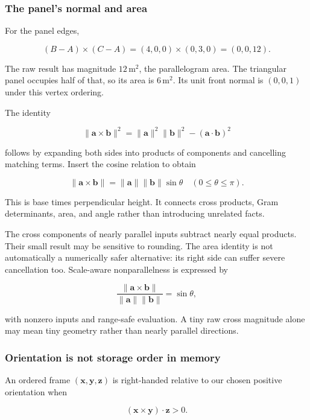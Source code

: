 \subsubsection{The panel's normal and area}\label{01-foundations-i-ch017-the-panels-normal-and-area}

For the panel edges,

\[
(B-A)\times(C-A)=(4,0,0)\times(0,3,0)=(0,0,12).
\]

The raw result has magnitude \(12\,\mathrm{m}^2\), the parallelogram area. The triangular panel occupies half of that, so its area is \(6\,\mathrm{m}^2\). Its unit front normal is \((0,0,1)\) under this vertex ordering.

The identity

\[
\|\mathbf a\times\mathbf b\|^2
=\|\mathbf a\|^2\|\mathbf b\|^2-(\mathbf a\cdot\mathbf b)^2
\]

follows by expanding both sides into products of components and cancelling matching terms. Insert the cosine relation to obtain

\[
\|\mathbf a\times\mathbf b\|=\|\mathbf a\|\|\mathbf b\|\sin\theta
\quad(0\le\theta\le\pi).
\]

This is base times perpendicular height. It connects cross products, Gram determinants, area, and angle rather than introducing unrelated facts.

The cross components of nearly parallel inputs subtract nearly equal products. Their small result may be sensitive to rounding. The area identity is not automatically a numerically safer alternative: its right side can suffer severe cancellation too. Scale-aware nonparallelness is expressed by

\[
\frac{\|\mathbf a\times\mathbf b\|}{\|\mathbf a\|\|\mathbf b\|}=\sin\theta,
\]

with nonzero inputs and range-safe evaluation. A tiny raw cross magnitude alone may mean tiny geometry rather than nearly parallel directions.

\subsubsection{Orientation is not storage order in memory}\label{01-foundations-i-ch017-orientation-is-not-storage-order-in-memory}

An ordered frame \((\mathbf x,\mathbf y,\mathbf z)\) is right-handed relative to our chosen positive orientation when

\[
(\mathbf x\times\mathbf y)\cdot\mathbf z>0.
\]

